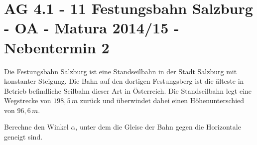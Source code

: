 \section{AG 4.1 - 11 Festungsbahn Salzburg - OA - Matura 2014/15 - Nebentermin 2}

\begin{beispiel}[AG 4.1]{1} %
				Die Festungsbahn Salzburg ist eine Standseilbahn in der Stadt Salzburg mit konstanter Steigung. Die Bahn auf den dortigen Festungsberg ist die älteste in Betrieb befindliche Seilbahn dieser Art in Österreich. Die Standseilbahn legt eine Wegstrecke von $198,5\,m$ zurück und überwindet dabei einen Höhenunterschied von $96,6\,m$.
				
				Berechne den Winkel $\alpha$, unter dem die Gleise der Bahn gegen die Horizontale geneigt sind.\\
				
\end{beispiel}